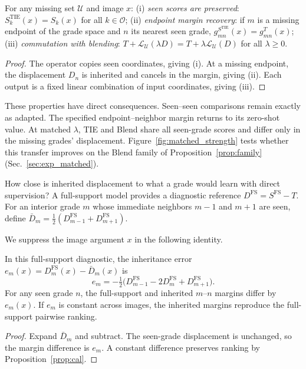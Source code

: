 \begin{proposition}
\label{prop:tie_structure}
For any missing set $\mathcal U$ and image $x$:
(i) \emph{seen scores are preserved}: $S_k^{\mathrm{TIE}}(x)=S_k(x)$ for all $k\in\mathcal O$;
(ii) \emph{endpoint margin recovery}: if $m$ is a missing endpoint of the grade space and $n$ its nearest seen grade, $g_{mn}^{S^{\mathrm{TIE}}}(x)=g_{mn}^T(x)$;
(iii) \emph{commutation with blending}: $T+\mathcal L_{\mathcal U}(\lambda D)=T+\lambda\mathcal L_{\mathcal U}(D)$ for all $\lambda\ge0$.
\end{proposition}
\begin{proof}
The operator copies seen coordinates, giving (i). At a missing endpoint, the displacement $D_n$ is inherited and cancels in the margin, giving (ii). Each output is a fixed linear combination of input coordinates, giving (iii).
\end{proof}

These properties have direct consequences. Seen--seen comparisons remain exactly as adapted. The specified endpoint--neighbor margin returns to its zero-shot value. At matched $\lambda$, TIE and Blend share all seen-grade scores and differ only in the missing grades' displacement. Figure~\ref{fig:matched_strength} tests whether this transfer improves on the Blend family of Proposition~\ref{prop:family} (Sec.~\ref{sec:exp_matched}).

How close is inherited displacement to what a grade would learn with direct supervision? A full-support model provides a diagnostic reference $D^{\mathrm{FS}}=S^{\mathrm{FS}}-T$. For an interior grade $m$ whose immediate neighbors $m-1$ and $m+1$ are seen, define $\bar D_m=\tfrac12(D_{m-1}^{\mathrm{FS}}+D_{m+1}^{\mathrm{FS}})$.

We suppress the image argument $x$ in the following identity.

\begin{proposition}
\label{prop:tie_error}
In this full-support diagnostic, the inheritance error $e_m(x)=D_m^{\mathrm{FS}}(x)-\bar D_m(x)$ is
\begin{equation}
e_m=-\tfrac12\bigl(
D_{m-1}^{\mathrm{FS}}
-2D_m^{\mathrm{FS}}
+D_{m+1}^{\mathrm{FS}}
\bigr).
\label{eq:tie_error}
\end{equation}
For any seen grade $n$, the full-support and inherited $m$--$n$ margins differ by $e_m(x)$. If $e_m$ is constant across images, the inherited margins reproduce the full-support pairwise ranking.
\end{proposition}
\begin{proof}
Expand $\bar D_m$ and subtract. The seen-grade displacement is unchanged, so the margin difference is $e_m$. A constant difference preserves ranking by Proposition~\ref{prop:cal}.
\end{proof}

